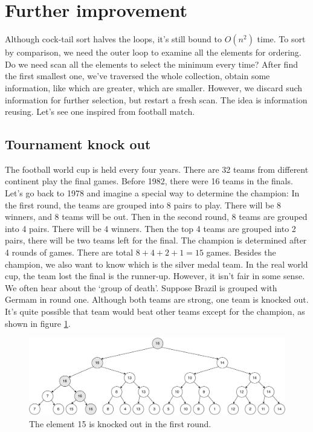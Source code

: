 \documentclass[b5paper]{article}
\begin{document}
\section{Further improvement}

Although cock-tail sort halves the loops, it's still bound to $O(n^2)$ time. To sort by comparison, we need the outer loop to examine all the elements for ordering. Do we need scan all the elements to select the minimum every time? After find the first smallest one, we've traversed the whole collection, obtain some information, like which are greater, which are smaller. However, we discard such information for further selection, but restart a fresh scan. The idea is information reusing. Let's see one inspired from football match.

\subsection{Tournament knock out}

The football world cup is held every four years. There are 32 teams from different continent play the final games. Before 1982, there were 16 teams in the finals. Let's go back to 1978 and imagine a special way to determine the champion: In the first round, the teams
are grouped into 8 pairs to play. There will be 8 winners, and 8 teams will be out. Then in the second round, 8 teams are grouped into 4 pairs. There will be 4 winners. Then the top 4 teams are grouped into 2 pairs, there will be two teams left for the final. The champion is determined after 4 rounds of games. There are total $8 + 4 + 2 + 1 = 15$ games. Besides the champion, we also want to know which is the silver medal team. In the real world cup, the team lost the final is the runner-up. However, it isn't fair in some sense. We often hear about the `group of death'. Suppose Brazil is grouped with Germam in round one. Although both teams are strong, one team is knocked out. It's quite possible that team would beat other teams except for the champion, as shown in figure \ref{fig:tournament-tree-1}.

\begin{figure}[htbp]
  \centering
  \includegraphics[scale=0.28]{img/tournament-tree-1}
  \caption{The element 15 is knocked out in the first round.}
  \label{fig:tournament-tree-1}
\end{figure}
\end{document}
